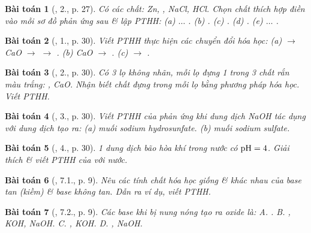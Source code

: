 \documentclass{article}
\newtheorem{baitoan}{Bài toán}
\begin{document}
\begin{baitoan}[\cite{SGK_Hoa_Hoc_9}, 2., p. 27]
	Có các chất: {\rm Zn, , NaCl, HCl}. Chọn chất thích hợp điền vào mỗi sơ đồ phản ứng sau \& lập PTHH: {\rm(a) $\ldots$ . (b) . (c) . (d) . (e) $\ldots$ }.
\end{baitoan}

\begin{baitoan}[\cite{SGK_Hoa_Hoc_9}, 1., p. 30]
	Viết {\rm PTHH} thực hiện các chuyển đổi hóa học: (a) {\rm{} $\to$ CaO $\to$  $\to$ }. (b) {\rm CaO $\to$ }. (c) {\rm{} $\to$ }.
\end{baitoan}

\begin{baitoan}[\cite{SGK_Hoa_Hoc_9}, 2., p. 30]
	Có 3 lọ không nhãn, mỗi lọ đựng 1 trong 3 chất rắn màu trắng: {\rm{}, CaO}. Nhận biết chất đựng trong mỗi lọ bằng phương pháp hóa học. Viết {\rm PTHH}.
\end{baitoan}

\begin{baitoan}[\cite{SGK_Hoa_Hoc_9}, 3., p. 30]
	Viết {\rm PTHH} của phản ứng khi dung dịch {\rm NaOH} tác dụng với dung dịch {\rm{}} tạo ra: (a) muối sodium hydrosunfate. (b) muối sodium sulfate.
\end{baitoan}

\begin{baitoan}[\cite{SGK_Hoa_Hoc_9}, 4., p. 30]
	1 dung dịch bão hòa khí {\rm{}} trong nước có $\rm pH = 4$. Giải thích \& viết PTHH của {\rm{}} với nước.
\end{baitoan}

\begin{baitoan}[\cite{SGK_Hoa_Hoc_9}, 7.1., p. 9]
	Nêu các tính chất hóa học giống \& khác nhau của base tan (kiềm) \& base không tan. Dẫn ra ví dụ, viết PTHH.
\end{baitoan}

\begin{baitoan}[\cite{SGK_Hoa_Hoc_9}, 7.2., p. 9]
	Các base khi bị nung nóng tạo ra oxide là: {\sf A.} {\rm{}}. {\sf B.} {\rm{}, KOH, NaOH}. {\sf C.} {\rm{}, KOH}. {\sf D.} {\rm{}, NaOH}.
\end{baitoan}
\end{document}
